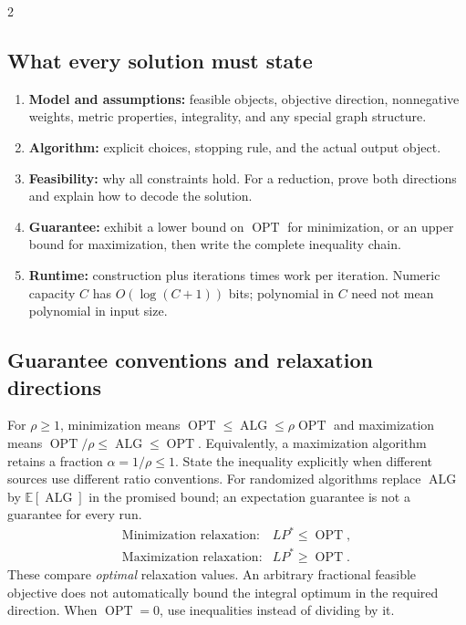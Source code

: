 \documentclass[8pt]{extarticle}
\theoremstyle{definition}
\newcommand{\OPT}{\operatorname{OPT}}
\newcommand{\ALG}{\operatorname{ALG}}
\begin{document}
\begin{multicols*}{2}
\subsection{What every solution must state}
\begin{enumerate}
\item \textbf{Model and assumptions:} feasible objects, objective direction, nonnegative
weights, metric properties, integrality, and any special graph structure.
\item \textbf{Algorithm:} explicit choices, stopping rule, and the actual output object.
\item \textbf{Feasibility:} why all constraints hold. For a reduction, prove both directions
and explain how to decode the solution.
\item \textbf{Guarantee:} exhibit a lower bound on $\OPT$ for minimization, or an upper
bound for maximization, then write the complete inequality chain.
\item \textbf{Runtime:} construction plus iterations times work per iteration. Numeric
capacity $C$ has $O(\log(C+1))$ bits; polynomial in $C$ need not mean polynomial in input size.
\end{enumerate}

\subsection{Guarantee conventions and relaxation directions}
For $\rho\ge1$, minimization means $\OPT\le\ALG\le\rho\OPT$ and maximization means
$\OPT/\rho\le\ALG\le\OPT$. Equivalently, a maximization algorithm retains a fraction
$\alpha=1/\rho\le1$. State the inequality explicitly when different sources use different
ratio conventions. For randomized algorithms replace $\ALG$ by $\mathbb E[\ALG]$ in the
promised bound; an expectation guarantee is not a guarantee for every run.
\[
\begin{array}{ll}
\text{Minimization relaxation:}&LP^*\le\OPT,\\
\text{Maximization relaxation:}&LP^*\ge\OPT.
\end{array}
\]
These compare \emph{optimal} relaxation values. An arbitrary fractional feasible objective
does not automatically bound the integral optimum in the required direction. When $\OPT=0$,
use inequalities instead of dividing by it.


\end{multicols*}
\end{document}
